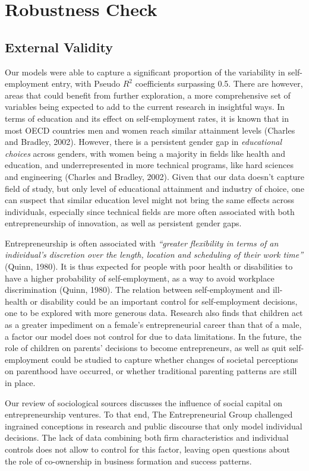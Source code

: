 \chapter{Robustness Check\label{ch:robustness}}

\section{External Validity}

Our models were able to capture a significant proportion of the variability in self-employment entry, with Pseudo $R^2$ coefficients surpassing 0.5. There are however, areas that could benefit from further exploration, a more comprehensive set of variables being expected to add to the current research in insightful ways. In terms of education and its effect on self-employment rates, it is known that in most OECD countries men and women reach similar attainment levels (Charles and Bradley, 2002). However, there is a persistent gender gap in \textit{educational choices} across genders, with women being a majority in fields like health and education, and underrepresented in more technical programs, like hard sciences and engineering (Charles and Bradley, 2002). Given that our data doesn’t capture field of study, but only level of educational attainment and industry of choice, one can suspect that similar education level might not bring the same effects across individuals, especially since technical fields are more often associated with both entrepreneurship of innovation, as well as persistent gender gaps. 

Entrepreneurship is often associated with \textit{“greater flexibility in terms of an individual’s discretion over the length, location and scheduling of their work time”} (Quinn, 1980). It is thus expected for people with poor health or disabilities to have a higher probability of self-employment, as a way to avoid workplace discrimination (Quinn, 1980). The relation between self-employment and ill-health or disability could be an important control for self-employment decisions, one to be explored with more generous data.  Research also finds that children act as a greater impediment on a female’s entrepreneurial career than that of a male, a factor our model does not control for due to data limitations. In the future, the role of children on parents’ decisions to become entrepreneurs, as well as quit self-employment could be studied to capture whether changes of societal perceptions on parenthood have occurred, or whether traditional parenting patterns are still in place.  

Our review of sociological sources discusses the influence of social capital on entrepreneurship ventures. To that end, The Entrepreneurial Group challenged ingrained conceptions in research and public discourse that only model individual decisions. The lack of data combining both firm characteristics and individual controls does not allow to control for this factor, leaving open questions about the role of co-ownership in business formation and success patterns. 